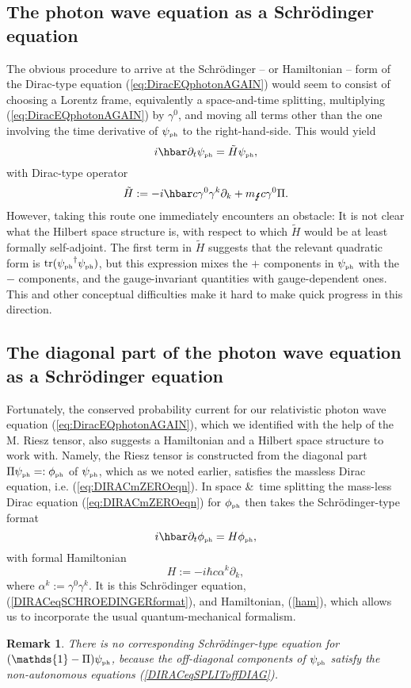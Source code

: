 \documentclass[11pt]{article}
\theoremstyle{definition}
\newtheorem{rem}[thm]{Remark}
\DeclareMathOperator{\tr}{tr}
\newcommand{\refeq}[1]{(\ref{#1})}
\numberwithin{equation}{section}
\newcommand{\beq}{\begin{equation}}
\newcommand{\eeq}{\end{equation}}
\newcommand{\Id}{\mathds{1}}
\newcommand{\p}{\partial}
\newcommand{\psiPH}{{\psi_{\mbox{\rm\tiny ph}}}}
\newcommand{\phiPH}{{\phi_{\mbox{\rm\tiny ph}}}}
\newcommand{\mPH}{{m_{\mbox{\Lightning}}}}
\newcommand{\al}{\alpha}
\newcommand{\ga}{\gamma}
\begin{document}
\subsection{The photon wave equation as a Schr\"odinger equation}\label{sec:schrodA}\vspace{-5pt}
 The obvious procedure to arrive at the Schr\"odinger -- or Hamiltonian -- form of the Dirac-type equation
\refeq{eq:DiracEQphotonAGAIN} would seem to consist of choosing a Lorentz frame, equivalently a space-and-time splitting, 
multiplying \refeq{eq:DiracEQphotonAGAIN} by $\ga^0$, and moving all terms other than the one involving the time 
derivative of $\psiPH$ to the right-hand-side. 
 This would yield
\beq\label{eq:SCHROEDfull}
i\hbar \p_{t} \psiPH = 
\tilde{H}\psiPH,
\eeq
with Dirac-type operator
\beq\label{eq:Hamfull}
\tilde{H} := -i\hbar c \ga^0 \ga^k \p_k + \mPH c \ga^0 \Pi.
\eeq
 However, taking this route one immediately encounters an obstacle: 
 It is not clear what the Hilbert space structure is, with respect to which 
$\tilde{H}$
would be at least formally self-adjoint. 
 The first term in 
$\tilde{H}$ suggests that the relevant quadratic form is $ \tr( \psiPH^\dag \psiPH )$, 
but this expression mixes the $+$ components in $\psiPH$ with the $-$ components, and the gauge-invariant quantities with gauge-dependent ones. 
This and other conceptual difficulties make it hard to make quick progress in this direction.\vspace{-5pt}

%
\subsection{The diagonal part of the photon wave equation as a Schr\"odinger equation}\label{sec:schrodB}\vspace{-5pt}
Fortunately, the conserved probability current for our relativistic photon wave equation \refeq{eq:DiracEQphotonAGAIN}, 
which we identified with the help of the M. Riesz tensor, also suggests a Hamiltonian and a Hilbert space 
structure to work with.
 Namely, the Riesz tensor is constructed from the diagonal part $\Pi\psiPH =: \phiPH$ of $\psiPH$, which
as we noted earlier, satisfies the massless Dirac equation, i.e. \refeq{eq:DIRACmZEROeqn}.
 In space \&\ time splitting the mass-less Dirac equation \refeq{eq:DIRACmZEROeqn} for $\phiPH$ then
takes the Schr\"odinger-type format
\beq 
\label{DIRACeqSCHROEDINGERformat}
i\hbar \p_t \phiPH = H\phiPH,
\eeq
with formal Hamiltonian 
\beq \label{ham}
H 
:=  -i\hbar c \al^k \p_k,
\eeq
where $\al^k := \ga^0\ga^k$.
 It is this Schr\"odinger equation, \refeq{DIRACeqSCHROEDINGERformat}, 
and Hamiltonian, \refeq{ham}, which allows us to incorporate the usual quantum-mechanical formalism.
%
\begin{rem}
\textit{There is no corresponding Schr\"odinger-type equation for $(\Id - \Pi)\psiPH$, because the off-diagonal components of $\psiPH$ 
satisfy the non-autonomous equations \refeq{DIRACeqSPLIToffDIAG}.}
\end{rem}
\end{document}
